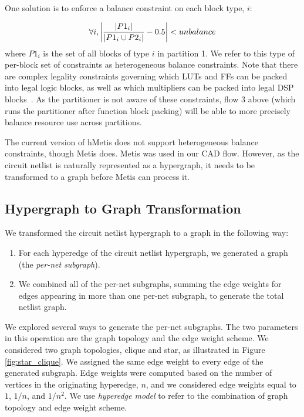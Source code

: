 One solution is to enforce a balance constraint on each block type, $i$:

\begin{equation}
\forall i, \abs*{ \frac{| P1_i |}{|P1_i \cup P2_i |} - 0.5} < unbalance
\end{equation}
where $P1_i$ is the set of all blocks of type $i$ in partition 1. We refer to this type of per-block set of constraints as heterogeneous balance constraints. Note that there are complex legality constraints governing which LUTs and FFs can be packed into legal logic blocks, as well as which multipliers can be packed into legal DSP blocks~\cite{luu2014vtr}. As the partitioner is not aware of these constraints, flow 3 above (which runs the partitioner after function block packing) will be able to more precisely balance resource use across partitions.

The current version of hMetis does not support heterogeneous balance constraints, though Metis does. Metis was used in our CAD flow. However, as the circuit netlist is naturally represented as a hypergraph, it needs to be transformed to a graph before Metis can process it.

\subsection{Hypergraph to Graph Transformation}\label{sec:hypergraph_to_graph}
We transformed the circuit netlist hypergraph to a graph in the following way:
\begin{enumerate}[label=(\roman*)]
\item For each hyperedge of the circuit netlist hypergraph, we generated a graph (the \emph{per-net subgraph}).
\item We combined all of the per-net subgraphs, summing the edge weights for edges appearing in more than one per-net subgraph, to generate the total netlist graph.
\end{enumerate}

We explored several ways to generate the per-net subgraphs. The two parameters in this operation are the graph topology and the edge weight scheme. We considered two graph topologies, clique and star, as illustrated in Figure \ref{fig:star_clique}. We assigned the same edge weight to every edge of the generated subgraph. Edge weights were computed based on the number of vertices in the originating hyperedge, $n$, and we considered edge weights equal to $1$, $1/n$, and $1/n^2$. We use \emph{hyperedge model} to refer to the combination of graph topology and edge weight scheme.

